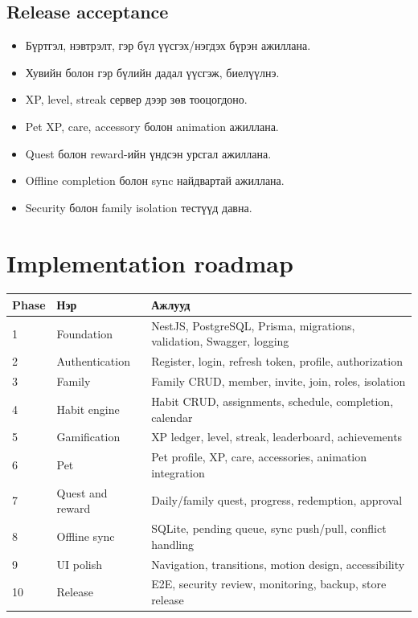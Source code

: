 \documentclass[12pt,a4paper,oneside]{report}
\begin{document}
\section{Release acceptance}
\begin{itemize}
  \item Бүртгэл, нэвтрэлт, гэр бүл үүсгэх/нэгдэх бүрэн ажиллана.
  \item Хувийн болон гэр бүлийн дадал үүсгэж, биелүүлнэ.
  \item XP, level, streak сервер дээр зөв тооцогдоно.
  \item Pet XP, care, accessory болон animation ажиллана.
  \item Quest болон reward-ийн үндсэн урсгал ажиллана.
  \item Offline completion болон sync найдвартай ажиллана.
  \item Security болон family isolation тестүүд давна.
\end{itemize}

\chapter{Implementation roadmap}

\begin{longtable}{p{}p{}p{}}
\toprule
\textbf{Phase} & \textbf{Нэр} & \textbf{Ажлууд}\\
\midrule
1 & Foundation & NestJS, PostgreSQL, Prisma, migrations, validation, Swagger, logging\\
2 & Authentication & Register, login, refresh token, profile, authorization\\
3 & Family & Family CRUD, member, invite, join, roles, isolation\\
4 & Habit engine & Habit CRUD, assignments, schedule, completion, calendar\\
5 & Gamification & XP ledger, level, streak, leaderboard, achievements\\
6 & Pet & Pet profile, XP, care, accessories, animation integration\\
7 & Quest and reward & Daily/family quest, progress, redemption, approval\\
8 & Offline sync & SQLite, pending queue, sync push/pull, conflict handling\\
9 & UI polish & Navigation, transitions, motion design, accessibility\\
10 & Release & E2E, security review, monitoring, backup, store release\\
\bottomrule
\end{longtable}
\end{document}
